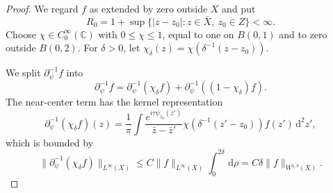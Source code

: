 \documentclass[10pt,a4paper]{amsart}
\newcommand{\C}{\mathbb{C}}
\newcommand{\dd}{\,\text{d}}
\newcommand{\pr}{\partial}
\newcommand{\psiz}{\psi_{z_0}}
\theoremstyle{plain}
\theoremstyle{definition}
\theoremstyle{remark}
\begin{document}
\begin{proof}
We regard $f$ as extended by zero outside $X$ and put
\begin{equation}
        R_0=1+\sup\{|z-z_0|:z\in\overline{X},\ z_0\in Z\}<\infty.
\end{equation}
Choose $\chi\in C_0^\infty(\C)$ with $0\leq \chi\leq1$, equal to one on $B(0,1)$ and to zero outside $B(0,2)$.  For $\delta>0$, let $\chi_\delta(z)=\chi(\delta^{-1}(z-z_0))$.

We split $\pr_\psi^{-1}f$ into
\begin{equation}
\pr_\psi^{-1} f=\pr_\psi^{-1}(\chi_\delta f)+\pr_\psi^{-1}\left((1-\chi_\delta)f\right).
\end{equation}
The near-center term has the kernel representation
\begin{equation}
\pr_\psi^{-1}(\chi_\delta f)(z)=\frac{1}{\pi}\int \frac{e^{i\tau\psiz(z')}}{\bar z-\bar z'}\chi(\delta^{-1}(z'-z_0))f(z')\dd^2 z',
\end{equation}
which is bounded by
\begin{equation}
\|\pr_\psi^{-1}(\chi_\delta f)\|_{L^\infty(X)}\leq C\|f\|_{L^\infty(X)}\int_0^{2\delta}\dd\rho=C\delta \|f\|_{W^{1,b}(X)}.
\end{equation}


\end{proof}
\end{document}
